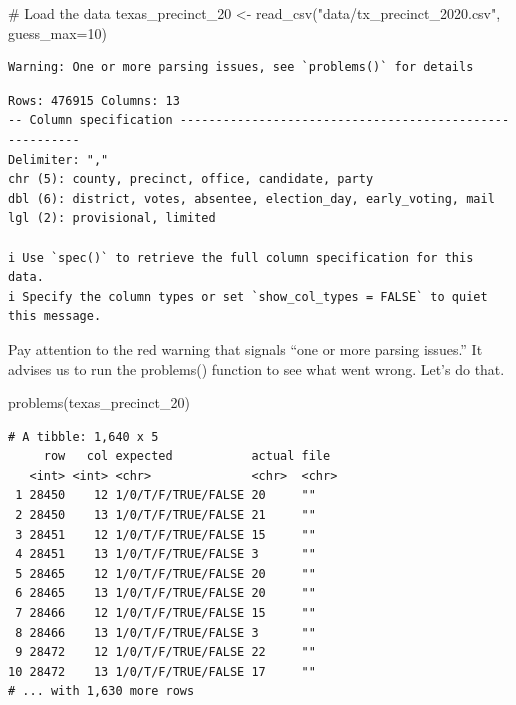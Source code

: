 \documentclass[
  letterpaper,
  DIV=11,
  numbers=noendperiod]{scrreprt}
\newenvironment{Shaded}{\begin{snugshade}}{\end{snugshade}}
\newcommand{\AttributeTok}[1]{\textcolor[rgb]{0.40,0.45,0.13}{#1}}
\newcommand{\CommentTok}[1]{\textcolor[rgb]{0.37,0.37,0.37}{#1}}
\newcommand{\DecValTok}[1]{\textcolor[rgb]{0.68,0.00,0.00}{#1}}
\newcommand{\FunctionTok}[1]{\textcolor[rgb]{0.28,0.35,0.67}{#1}}
\newcommand{\NormalTok}[1]{\textcolor[rgb]{0.00,0.23,0.31}{#1}}
\newcommand{\OtherTok}[1]{\textcolor[rgb]{0.00,0.23,0.31}{#1}}
\newcommand{\StringTok}[1]{\textcolor[rgb]{0.13,0.47,0.30}{#1}}
\begin{document}
\begin{Shaded}
\begin{Highlighting}[]
\CommentTok{\# Load the data}
\NormalTok{texas\_precinct\_20 }\OtherTok{\textless{}{-}} \FunctionTok{read\_csv}\NormalTok{(}\StringTok{"data/tx\_precinct\_2020.csv"}\NormalTok{, }\AttributeTok{guess\_max=}\DecValTok{10}\NormalTok{)}
\end{Highlighting}
\end{Shaded}

\begin{verbatim}
Warning: One or more parsing issues, see `problems()` for details
\end{verbatim}

\begin{verbatim}
Rows: 476915 Columns: 13
-- Column specification --------------------------------------------------------
Delimiter: ","
chr (5): county, precinct, office, candidate, party
dbl (6): district, votes, absentee, election_day, early_voting, mail
lgl (2): provisional, limited

i Use `spec()` to retrieve the full column specification for this data.
i Specify the column types or set `show_col_types = FALSE` to quiet this message.
\end{verbatim}

Pay attention to the red warning that signals ``one or more parsing
issues.'' It advises us to run the problems() function to see what went
wrong. Let's do that.

\begin{Shaded}
\begin{Highlighting}[]
\FunctionTok{problems}\NormalTok{(texas\_precinct\_20)}
\end{Highlighting}
\end{Shaded}

\begin{verbatim}
# A tibble: 1,640 x 5
     row   col expected           actual file 
   <int> <int> <chr>              <chr>  <chr>
 1 28450    12 1/0/T/F/TRUE/FALSE 20     ""   
 2 28450    13 1/0/T/F/TRUE/FALSE 21     ""   
 3 28451    12 1/0/T/F/TRUE/FALSE 15     ""   
 4 28451    13 1/0/T/F/TRUE/FALSE 3      ""   
 5 28465    12 1/0/T/F/TRUE/FALSE 20     ""   
 6 28465    13 1/0/T/F/TRUE/FALSE 20     ""   
 7 28466    12 1/0/T/F/TRUE/FALSE 15     ""   
 8 28466    13 1/0/T/F/TRUE/FALSE 3      ""   
 9 28472    12 1/0/T/F/TRUE/FALSE 22     ""   
10 28472    13 1/0/T/F/TRUE/FALSE 17     ""   
# ... with 1,630 more rows
\end{verbatim}
\end{document}
